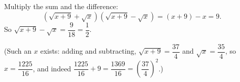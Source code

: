 Multiply the sum and the difference:
\[\left(\sqrt{x+9}+\sqrt x\right)\left(\sqrt{x+9}-\sqrt x\right)=(x+9)-x=9 .\]
So $\sqrt{x+9}-\sqrt x=\dfrac{9}{18}=\boxed{\dfrac{1}{2}}$.

(Such an $x$ exists: adding and subtracting, $\sqrt{x+9}=\dfrac{37}{4}$ and $\sqrt x=\dfrac{35}{4}$, so $x=\dfrac{1225}{16}$, and indeed $\dfrac{1225}{16}+9=\dfrac{1369}{16}=\left(\dfrac{37}{4}\right)^2$.)
